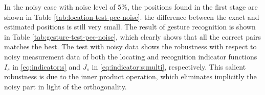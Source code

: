 \documentclass[a4paper,11pt]{article}
\theoremstyle{remark}
\theoremstyle{definition}
\numberwithin{equation}{section}
\begin{document}
%
%
%



In the noisy case with noise level of $5\%$,  the positions found in the first stage are shown in Table \ref{tab:location-test-pec-noise}.
the difference between the exact and estimated positions is still very small.
The result of gesture recognition is shown in Table \ref{tab:gesture-test-pec-noise}, which clearly shows that  all the correct pairs matches the best.
The test with noisy data shows the robustness with respect to
noisy measurement data  of both the locating and recognition indicator functions $I_s$ in \eqref{eq:indicator:s} and $J_s$ in \eqref{eq:indicator:s:multi}, respectively. This salient robustness
is due to the inner product operation, which eliminates implicitly the noisy part in light of the orthogonality.
\end{document}
